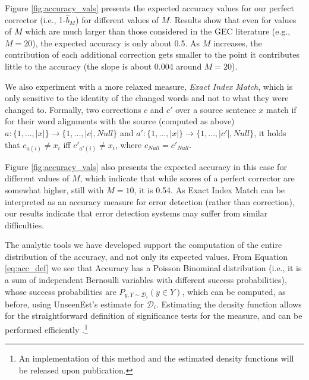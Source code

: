 \documentclass[letterpaper, 11pt]{article}
\newcommand{\lc}[1]{\footnote{\color{blue}LC: #1}}
\begin{document}
Figure \ref{fig:accuracy_vals} presents the expected accuracy values for our perfect
corrector (i.e., 1-$\hat{b}_M$) for different values of $M$. 
Results show that even for values of $M$ which are much larger than those considered in the GEC literature (e.g., $M=20$),
the expected accuracy is only about 0.5. As $M$ increases, the contribution of each additional correction
  gets smaller to the point it contributes little to the accuracy (the slope is about 0.004 around $M=20$).

We also experiment with a more relaxed measure, {\it Exact Index Match}, which is only sensitive
to the identity of the changed words and not to what they were changed to. 
Formally, two corrections $c$ and $c'$ over a source sentence $x$ match
if for their word alignments with the source (computed as above) $a:\{1,...,\left|x\right|\} \rightarrow \{1,...,\left|c\right|,Null\}$
and $a':\{1,...,\left|x\right|\} \rightarrow \{1,...,\left|c'\right|,Null\}$, it holds that $c_{a\left(i\right)} \neq x_{i}$ iff $c'_{a'\left(i\right)} \neq x_{i}$, where $c_{Null}=c'_{Null}$.

Figure \ref{fig:accuracy_vals} also presents the expected accuracy in this case
for different values of $M$, which indicate that while scores of a perfect corrector are somewhat higher,
still with $M=10$, it is 0.54.
As Exact Index Match can be interpreted as an accuracy measure for error detection (rather than correction),
our results indicate that error detection systems may suffer from similar difficulties.
%

The analytic tools we have developed support the computation of the entire distribution of the accuracy,
and not only its expected values. From Equation \ref{eq:acc_def} we see that Accuracy has a Poisson Binominal distribution (i.e., it is a sum of independent Bernoulli variables with different success probabilities), whose success probabilities are $P_{y,Y \sim \mathcal{D}_i}(y \in Y)$, which can be computed, as before, using {\sc UnseenEst}'s estimate for $\mathcal{D}_i$. Estimating the density function allows for the straightforward definition of significance tests for the measure, and can be performed efficiently \cite{hong2013computing}.\footnote{An implementation of this method and the estimated density functions will be released upon publication.}
\end{document}
